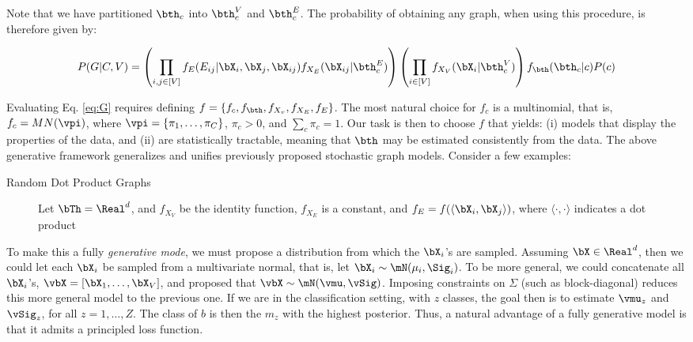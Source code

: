 % 
% 

Note that we have partitioned $\bth_c$ into $\bth_c^V$ and $\bth_c^E$.  The probability of obtaining any graph, when using this procedure, is therefore given by:

\begin{align} \label{eq:G}
	P(G | C,V) = \left(\prod_{i,j \in [V]} f_E(E_{ij} | \bX_i, \bX_j, \bX_{ij}) f_{X_E}(\bX_{ij} | \bth_c^E) \right) \left(\prod_{i \in [V]} f_{X_V}(\bX_i | \bth_c^V) \right) f_{\bth}(\bth_c | c)  P(c)
\end{align}

Evaluating Eq. \ref{eq:G} requires defining $f=\{f_c, f_{\bth}, f_{X_v}, f_{X_E}, f_E\}$.  The most natural choice for $f_c$ is a multinomial, that is, $f_c = MN(\vpi)$, where $\vpi = \{\pi_1, \ldots, \pi_C\}$, $\pi_c>0$, and $\sum_c \pi_c = 1$.   Our task is then to choose $f$ that yields: (i) models that display the properties of the data, and (ii) are statistically tractable, meaning that $\bth$ may be estimated consistently from the data.  The above generative framework generalizes and unifies previously proposed stochastic graph models.  Consider a few examples:

\begin{description}
	\item[Random Dot Product Graphs]  Let $\bTh = \Real^d$, and $f_{X_V}$ be the identity function, $f_{X_E}$ is a constant, and $f_E=f(\langle \bX_i, \bX_j \rangle)$, where $\langle \cdot , \cdot \rangle$  indicates a dot product

\end{description}




To make this a fully \emph{generative mode}, we must propose a distribution from which the $\bX_i$'s are sampled.  Assuming $\bX \in \Real^d$, then we could let each $\bX_i$ be sampled from a multivariate normal, that is, let $\bX_i \sim \mN(\mu_i,\Sig_i)$.  To be more general, we could concatenate all $\bX_i$'s, $\vbX=[\bX_1, \ldots, \bX_V]$, and proposed that $\vbX \sim \mN(\vmu, \vSig)$.  Imposing constraints on $\Sigma$ (such as block-diagonal) reduces this more general model to the previous one.  If we are in the classification setting, with $z$ classes, the goal then is to estimate $\vmu_z$ and $\vSig_z$, for all $z=1,\ldots, Z$.  The class of $b$ is then the $m_z$ with the highest posterior.  Thus, a natural advantage of a fully generative model is that it admits a principled loss function.  

